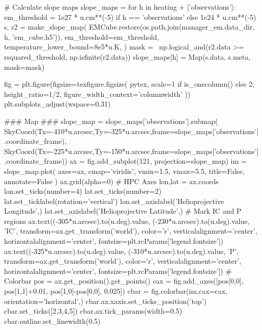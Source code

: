 \begin{pycode}[manager_em]
# Calculate slope maps
slope_maps = {}
for h in heating + ['observations']:
    em_threshold = 1e27 * u.cm**(-5) if h == 'observations' else 1e24 * u.cm**(-5)
    s, r2 = make_slope_map(
        EMCube.restore(os.path.join(manager_em.data_dir, h, 'em_cube.h5')),
        em_threshold=em_threshold,
        temperature_lower_bound=8e5*u.K,
    )
    mask = ~np.logical_and(r2.data >= rsquared_threshold, np.isfinite(r2.data))
    slope_maps[h] = Map(s.data, s.meta, mask=mask)

fig = plt.figure(figsize=texfigure.figsize(
    pytex,
    scale=1 if is_onecolumn() else 2,
    height_ratio=1/2,
    figure_width_context='columnwidth'
))
plt.subplots_adjust(wspace=0.31)

### Map ###
slope_map = slope_maps['observations'].submap(
    SkyCoord(Tx=-410*u.arcsec,Ty=-325*u.arcsec,frame=slope_maps['observations'].coordinate_frame),
    SkyCoord(Tx=-225*u.arcsec,Ty=-150*u.arcsec,frame=slope_maps['observations'].coordinate_frame))
ax = fig.add_subplot(121, projection=slope_map)
im = slope_map.plot(
    axes=ax,
    cmap='viridis',
    vmin=1.5,
    vmax=5.5,
    title=False,
    annotate=False
)
ax.grid(alpha=0)
# HPC Axes
lon,lat = ax.coords
lon.set_ticks(number=4)
lat.set_ticks(number=2)
lat.set_ticklabel(rotation='vertical')
lon.set_axislabel('Helioprojective Longitude',)
lat.set_axislabel('Helioprojective Latitude',)
# Mark IC and P regions
ax.text((-305*u.arcsec).to(u.deg).value,
        (-230*u.arcsec).to(u.deg).value,
        'IC',
        transform=ax.get_transform('world'),
        color='r',
        verticalalignment='center',
        horizontalalignment='center',
        fontsize=plt.rcParams['legend.fontsize'])
ax.text((-325*u.arcsec).to(u.deg).value,
        (-310*u.arcsec).to(u.deg).value,
        'P',
        transform=ax.get_transform('world'),
        color='r',
        verticalalignment='center',
        horizontalalignment='center',
        fontsize=plt.rcParams['legend.fontsize'])
# Colorbar
pos = ax.get_position().get_points()
cax = fig.add_axes([pos[0,0], pos[1,1]+0.01, pos[1,0]-pos[0,0], 0.025])
cbar = fig.colorbar(im,cax=cax, orientation='horizontal',)
cbar.ax.xaxis.set_ticks_position('top')
cbar.set_ticks([2,3,4,5])
cbar.ax.tick_params(width=0.5)
cbar.outline.set_linewidth(0.5)


\end{pycode}
